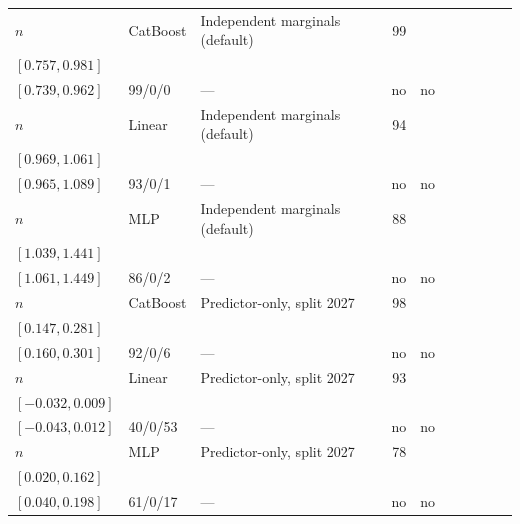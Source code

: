 \begin{longtable}{@{}ll>{\raggedright\arraybackslash}p{1.1in}rllrlll@{}}
$n$ & CatBoost & Independent marginals (default) & 99 & \begin{tabular}[t]{@{}l@{}}$0.875$\\\tiny$[0.757, 0.981]$\end{tabular} & \begin{tabular}[t]{@{}l@{}}$0.842$\\\tiny$[0.739, 0.962]$\end{tabular} & 99/0/0 & --- & no & no \\
$n$ & Linear & Independent marginals (default) & 94 & \begin{tabular}[t]{@{}l@{}}$1.011$\\\tiny$[0.969, 1.061]$\end{tabular} & \begin{tabular}[t]{@{}l@{}}$1.017$\\\tiny$[0.965, 1.089]$\end{tabular} & 93/0/1 & --- & no & no \\
$n$ & MLP & Independent marginals (default) & 88 & \begin{tabular}[t]{@{}l@{}}$1.121$\\\tiny$[1.039, 1.441]$\end{tabular} & \begin{tabular}[t]{@{}l@{}}$1.229$\\\tiny$[1.061, 1.449]$\end{tabular} & 86/0/2 & --- & no & no \\
$n$ & CatBoost & Predictor-only, split 2027 & 98 & \begin{tabular}[t]{@{}l@{}}$0.214$\\\tiny$[0.147, 0.281]$\end{tabular} & \begin{tabular}[t]{@{}l@{}}$0.230$\\\tiny$[0.160, 0.301]$\end{tabular} & 92/0/6 & --- & no & no \\
$n$ & Linear & Predictor-only, split 2027 & 93 & \begin{tabular}[t]{@{}l@{}}$-0.006$\\\tiny$[-0.032, 0.009]$\end{tabular} & \begin{tabular}[t]{@{}l@{}}$-0.010$\\\tiny$[-0.043, 0.012]$\end{tabular} & 40/0/53 & --- & no & no \\
$n$ & MLP & Predictor-only, split 2027 & 78 & \begin{tabular}[t]{@{}l@{}}$0.104$\\\tiny$[0.020, 0.162]$\end{tabular} & \begin{tabular}[t]{@{}l@{}}$0.128$\\\tiny$[0.040, 0.198]$\end{tabular} & 61/0/17 & --- & no & no \\

\end{longtable}
